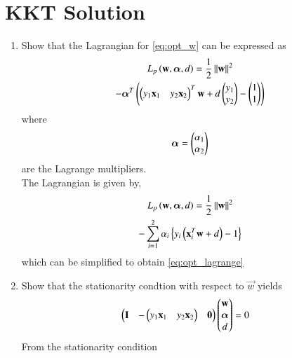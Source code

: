 \documentclass[journal,12pt,twocolumn]{IEEEtran}
\renewcommand\thesection{\arabic{section}}
\begin{document}
\begin{enumerate}[label=\thesection.\arabic*,ref=\thesection.\theenumi]
\begin{figure}[!ht]
\caption{}
\label{fig:svm_graph}
\end{figure}
\end{enumerate}
\section{KKT Solution}
\begin{enumerate}[label=\thesection.\arabic*,ref=\thesection.\theenumi]

\item Show that the Lagrangian for \eqref{eq:opt_w}  can be expressed as
\begin{multline}
\label{eq:opt_lagrange}
L_p\left(\mathbf{w},\bm{\alpha},d\right)
= \frac{1}{2}\left\Vert\mathbf{w}\right\Vert^2 
\\
-
\bm{\alpha}^T 
\left(\begin{pmatrix}y_1\mathbf{x}_1& y_2\mathbf{x}_2\end{pmatrix}^T\mathbf{w}+d\begin{pmatrix}y_1 \\ y_2\end{pmatrix}-\begin{pmatrix}1\\1\end{pmatrix} \right)
\end{multline}
where
\begin{align}
\bm{\alpha} = \begin{pmatrix}\alpha_1 \\ \alpha_2\end{pmatrix}
\end{align}
are the Lagrange multipliers.
\\
\solution
The Lagrangian is given by, 
\begin{multline}
L_p\left(\mathbf{w},\bm{\alpha},d\right)= \frac{1}{2}\left\Vert\mathbf{w}\right\Vert^2 
\\
- 
\sum_{i=1}^{2}\alpha_i\left\{y_i\left(\mathbf{x}_i^T\mathbf{w}+d\right) -1\right\}
\end{multline}
which can be simplified to obtain \eqref{eq:opt_lagrange}
%
\item Show that the stationarity condtion  with respect to $\vec{w}$ yields
\begin{align}
 \begin{pmatrix}\mathbf{I} & -\begin{pmatrix}y_1\mathbf{x}_1 & y_2\mathbf{x}_2\end{pmatrix} & \mathbf{0}\end{pmatrix}\begin{pmatrix}\mathbf{w} 
\\\bm{\alpha} \\ d\end{pmatrix} &= 0
\label{eq:opt_stationw}
\end{align}
%
\solution From the stationarity condition

\end{enumerate}
\end{document}
